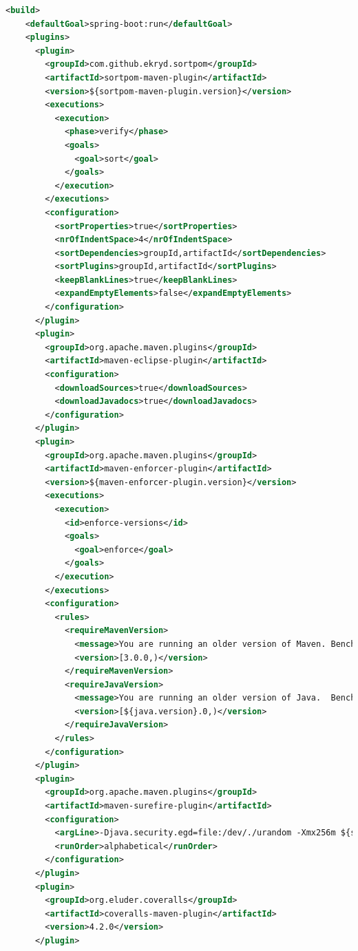 \documentclass[11pt,a4paper]{article}
\begin{document}
\begin{lstlisting}[language=xml]
  <build>
    <defaultGoal>spring-boot:run</defaultGoal>
    <plugins>
      <plugin>
        <groupId>com.github.ekryd.sortpom</groupId>
        <artifactId>sortpom-maven-plugin</artifactId>
        <version>${sortpom-maven-plugin.version}</version>
        <executions>
          <execution>
            <phase>verify</phase>
            <goals>
              <goal>sort</goal>
            </goals>
          </execution>
        </executions>
        <configuration>
          <sortProperties>true</sortProperties>
          <nrOfIndentSpace>4</nrOfIndentSpace>
          <sortDependencies>groupId,artifactId</sortDependencies>
          <sortPlugins>groupId,artifactId</sortPlugins>
          <keepBlankLines>true</keepBlankLines>
          <expandEmptyElements>false</expandEmptyElements>
        </configuration>
      </plugin>
      <plugin>
        <groupId>org.apache.maven.plugins</groupId>
        <artifactId>maven-eclipse-plugin</artifactId>
        <configuration>
          <downloadSources>true</downloadSources>
          <downloadJavadocs>true</downloadJavadocs>
        </configuration>
      </plugin>
      <plugin>
        <groupId>org.apache.maven.plugins</groupId>
        <artifactId>maven-enforcer-plugin</artifactId>
        <version>${maven-enforcer-plugin.version}</version>
        <executions>
          <execution>
            <id>enforce-versions</id>
            <goals>
              <goal>enforce</goal>
            </goals>
          </execution>
        </executions>
        <configuration>
          <rules>
            <requireMavenVersion>
              <message>You are running an older version of Maven. Benchmark Management Server requires at least Maven 3.0</message>
              <version>[3.0.0,)</version>
            </requireMavenVersion>
            <requireJavaVersion>
              <message>You are running an older version of Java.  Benchmark Management Server requires at least JDK ${java.version}</message>
              <version>[${java.version}.0,)</version>
            </requireJavaVersion>
          </rules>
        </configuration>
      </plugin>
      <plugin>
        <groupId>org.apache.maven.plugins</groupId>
        <artifactId>maven-surefire-plugin</artifactId>
        <configuration>
          <argLine>-Djava.security.egd=file:/dev/./urandom -Xmx256m ${surefireArgLine}</argLine>
          <runOrder>alphabetical</runOrder>
        </configuration>
      </plugin>
      <plugin>
        <groupId>org.eluder.coveralls</groupId>
        <artifactId>coveralls-maven-plugin</artifactId>
        <version>4.2.0</version>
      </plugin>

\end{lstlisting}
\end{document}
